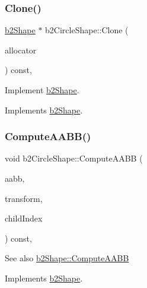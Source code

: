 \subsubsection{\texorpdfstring{Clone()}{Clone()}}
{\footnotesize\ttfamily \mbox{\hyperlink{classb2_shape}{b2\+Shape}} $\ast$ b2\+Circle\+Shape\+::\+Clone (\begin{DoxyParamCaption}\item[{\mbox{\hyperlink{classb2_block_allocator}{b2\+Block\+Allocator}} $\ast$}]{allocator }\end{DoxyParamCaption}) const\hspace{0.3cm}{\ttfamily [override]}, {\ttfamily [virtual]}}



Implement \mbox{\hyperlink{classb2_shape}{b2\+Shape}}. 



Implements \mbox{\hyperlink{classb2_shape_a4716243454bb9cf7c7ee1d9cb23ae634}{b2\+Shape}}.

\mbox{\label{classb2_circle_shape_af4a4ea78780af7a7ce40bf5d54affe83}} 
\subsubsection{\texorpdfstring{ComputeAABB()}{ComputeAABB()}}
{\footnotesize\ttfamily void b2\+Circle\+Shape\+::\+Compute\+A\+A\+BB (\begin{DoxyParamCaption}\item[{\mbox{\hyperlink{structb2_a_a_b_b}{b2\+A\+A\+BB}} $\ast$}]{aabb,  }\item[{const \mbox{\hyperlink{structb2_transform}{b2\+Transform}} \&}]{transform,  }\item[{\mbox{\hyperlink{b2_settings_8h_a43d43196463bde49cb067f5c20ab8481}{int32}}}]{child\+Index }\end{DoxyParamCaption}) const\hspace{0.3cm}{\ttfamily [override]}, {\ttfamily [virtual]}}

\begin{DoxySeeAlso}{See also}
\mbox{\hyperlink{classb2_shape_a88e9807fab0c8ca9a98d8926e50a1411}{b2\+Shape\+::\+Compute\+A\+A\+BB}} 
\end{DoxySeeAlso}


Implements \mbox{\hyperlink{classb2_shape_a88e9807fab0c8ca9a98d8926e50a1411}{b2\+Shape}}.

